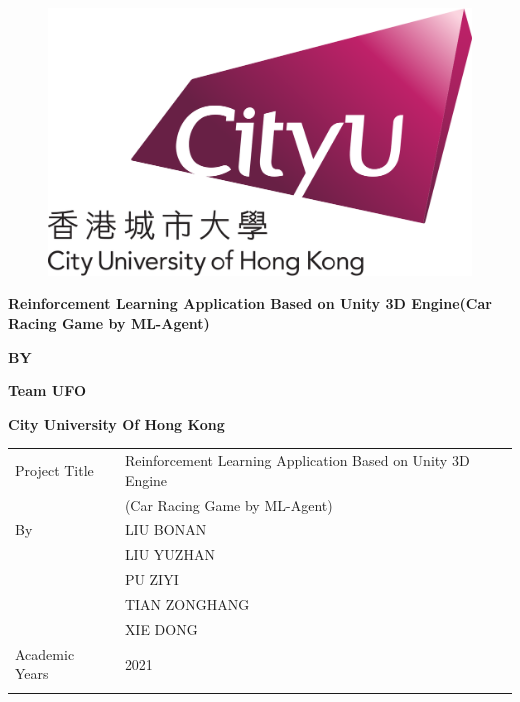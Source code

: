 \documentclass[12pt,a4paper,oneside]{book}
\theoremstyle{plain}
\numberwithin{equation}{chapter} \DeclareMathOperator{\Var}{Var}
\begin{document}
\thispagestyle{empty}

\begin{figure}[h!]
\vskip1in
\begin{center}
\includegraphics[width = 8 cm]{CityU_logo.png}
\end{center}
\end{figure}

\begin{center}
\LARGE{\textbf{Reinforcement Learning Application Based on Unity 3D Engine(Car Racing Game by ML-Agent)}}
\end{center}

\vskip1.5cm

\begin{center}
\textbf{BY}
\end{center}

\vskip1.6cm

\begin{center}
\large{\textbf{Team UFO}}
\end{center}



\vskip3.5cm
 

\begin{center}
\textbf{City University Of Hong Kong }
\end{center}


\newpage
{}
\begin{table}[h]
	\begin{tabular}{ll}
		Project Title								   & Reinforcement Learning Application Based on Unity 3D Engine	  \\
										 					&(Car Racing Game by ML-Agent) \\
										 					
		By							   					  & LIU BONAN \\
															& LIU YUZHAN \\
															& PU ZIYI \\
                                                            & TIAN ZONGHANG\\
                                                            & XIE DONG \\
	
	
		Academic Years							  & 2021 \\
\\
	\end{tabular}
\end{table}
\end{document}
